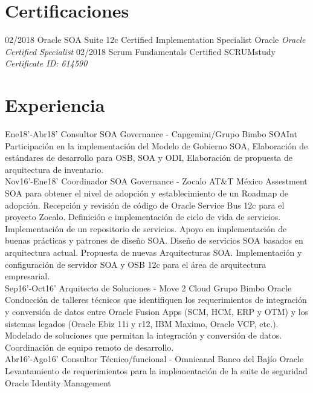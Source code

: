 \documentclass[]{friggeri-cv}
\begin{document}
\section{Certificaciones}
\begin{entrylist}
  \entry
    {02/2018}
    {Oracle SOA Suite 12c Certified Implementation Specialist}
    {Oracle}
    {\emph{Oracle Certified Specialist}}
     \entry
    {02/2018}
    {Scrum Fundamentals Certified}
    {SCRUMstudy}
    {\emph{Certificate ID: 614590}}
\end{entrylist}

\section{Experiencia}
\begin{entrylist}
  \entry
    {Ene18'-Abr18'}
    {Consultor SOA Governance - Capgemini/Grupo Bimbo}
    {SOAInt}
    {Participación en la implementación del Modelo de Gobierno SOA, Elaboración de estándares de desarrollo para OSB, SOA y ODI, Elaboración de propuesta de arquitectura de inventario.\\}
  \entry
    {Nov16'-Ene18'}
    {Coordinador SOA Governance - Zocalo}
    {AT\&T México}
    {Assestment SOA para obtener el nivel de adopción y establecimiento de un Roadmap de adopción. Recepción y revisión de código de Oracle Service Bus 12c para el proyecto Zocalo. Definición e implementación de ciclo de vida de servicios. Implementación de un repositorio de servicios. Apoyo en implementación de buenas prácticas y patrones de diseño SOA. Diseño de servicios SOA basados en arquitectura actual. Propuesta de nuevas Arquitecturas SOA. Implementación y configuración de servidor SOA y OSB 12c para el área de arquitectura empresarial.\\}
  \entry
    {Sep16'-Oct16'}
    {Arquitecto de Soluciones - Move 2 Cloud Grupo Bimbo}
    {Oracle}
    {Conducción de talleres técnicos que identifiquen los requerimientos de integración y conversión de datos entre Oracle Fusion Apps (SCM, HCM, ERP y OTM) y los sistemas legados (Oracle Ebiz 11i y r12, IBM Maximo, Oracle VCP, etc.). Modelado de soluciones que permitan la integración y conversión de datos. Coordinación de equipo remoto de desarrollo. \\}
  \entry
    {Abr16'-Ago16'}
    {Consultor Técnico/funcional - Omnicanal Banco del Bajío}
    {Oracle}
    {Levantamiento de requerimientos para la implementación de la suite de seguridad Oracle Identity Management\\}
   
\end{entrylist}
\\
\newpage
\end{document}
